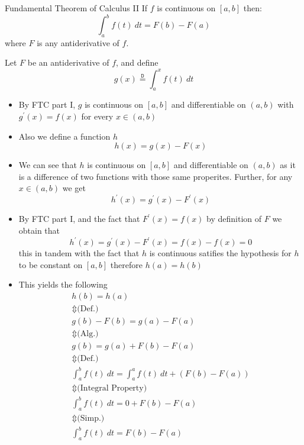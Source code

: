\documentclass{standalone}
\begin{document}
\begin{theo*}{Fundamental Theorem of Calculus II}
  If $f$ is continuous on $ \left[ a, b \right]$ then:
  \[
  \int_a ^{b} f\left(t\right)\: dt = F\left(b\right)  -  F\left(a\right)
  \]
  where $F$ is any antiderivative of $f$.
  \begin{pf}
    Let $F$ be an antiderivative of $f$, and define
    \[
    g\left(x\right) \stackrel{\mathtt{D}}{=} \int_{a} ^{x} f\left(t\right)\: dt
    \]
    \begin{itemize}
      \item By FTC part I, $g$ is continuous on $ \left[ a, b \right]$ and differentiable on $ \left( a, b \right)$ with $g ^{\prime}\left(x\right) = f\left(x\right)$ for every $x \in \left( a,b \right)$ 
      \item Also we define a function $h$ 
        \[
        h\left(x\right) = g\left(x\right)  -  F\left(x\right)
        \]
      \item We can see that $h$ is continuous on $ \left[ a, b \right]$ and differentiable on $ \left(  a, b \right)$ as it is a difference of two functions with those same properites. Further, for any $x \in  \left( a, b \right)$ we get
        \[
        h ^{\prime}\left(x\right) = g ^{\prime}\left(x\right)  -  F ^{\prime}\left(x\right)
        \]
      \item By FTC part I, and the fact that $F ^{\prime}\left(x\right) = f\left(x\right)$ by definition of $F$ we obtain that 
        \[
        h ^{\prime}\left(x\right) = g ^{\prime}\left(x\right)  -  F ^{\prime}\left(x\right) = f\left(x\right)  -  f\left(x\right) = 0
        \]
        this in tandem with the fact that $h$ is continuous satifies the hypothesis for $h$ to be constant on $ \left[ a,b \right]$ therefore $h\left(a\right) = h\left(b\right)$ 
      \item This yields the following
        \begin{gather*}
          h\left(b\right) = h\left(a\right) \\
          \Updownarrow \text{(Def.)} \\
          g\left(b\right)  -  F\left(b\right) = g\left(a\right)  -  F\left(a\right)\\
          \Updownarrow \text{(Alg.)} \\
          g\left(b\right)  =    g\left(a\right) + F\left(b\right)  -  F\left(a\right)\\
          \Updownarrow \text{(Def.)} \\
          \int _{a} ^{b} f\left(t\right)\: dt = \int _{a} ^{a} f\left(t\right)\: dt   +  \left( F\left(b\right)  -  F\left(a\right) \right) \\
          \Updownarrow \text{(Integral Property)} \\
          \int _{a} ^{b} f\left(t\right)\: dt = 0  +  F\left(b\right)  -  F\left(a\right) \\
          \Updownarrow \text{(Simp.)} \\
          \int _{a} ^{b} f\left(t\right)\: dt = F\left(b\right)  -  F\left(a\right)
        \end{gather*}
    \end{itemize}
  \end{pf}
\end{theo*}
\end{document}
